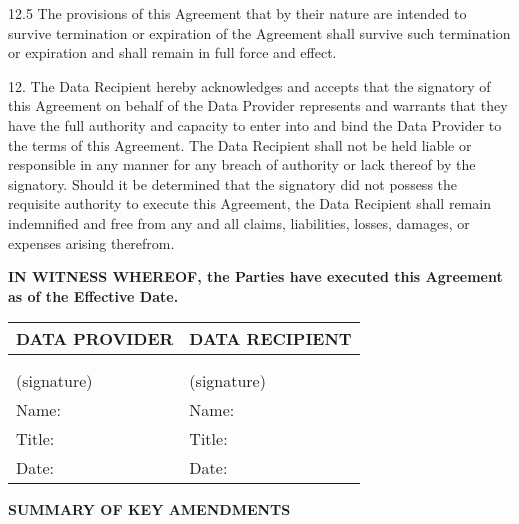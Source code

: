12.5 The provisions of this Agreement that by their nature are intended to survive termination or expiration of the Agreement shall survive such termination or expiration and shall remain in full force and effect.


12. The Data Recipient hereby acknowledges and accepts that the signatory of this Agreement on behalf of the Data Provider represents and warrants that they have the full authority and capacity to enter into and bind the Data Provider to the terms of this Agreement. The Data Recipient shall not be held liable or responsible in any manner for any breach of authority or lack thereof by the signatory. Should it be determined that the signatory did not possess the requisite authority to execute this Agreement, the Data Recipient shall remain indemnified and free from any and all claims, liabilities, losses, damages, or expenses arising therefrom.

\vspace{0.5cm}

\textbf{IN WITNESS WHEREOF, the Parties have executed this Agreement as of the  Effective Date.}

\vspace{1cm}

\begin{tabular}{|p{}|p{}|}
\hline
\textbf{DATA PROVIDER} & \textbf{DATA RECIPIENT} \\
\hline
 & \\
 & \\
\hline
(signature) & (signature) \\
\hline
Name: & Name: \\
\hline
Title: & Title: \\
\hline
Date: & Date: \\
\hline
\end{tabular}

\vspace{2cm}

\begin{center}
\textbf{\Large SUMMARY OF KEY AMENDMENTS}
\end{center}


